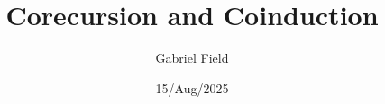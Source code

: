 \documentclass{beamer}
\title{Corecursion and Coinduction}
\author{Gabriel Field}
\date{15/Aug/2025}
\begin{document}
\frame{\titlepage}


\end{document}
